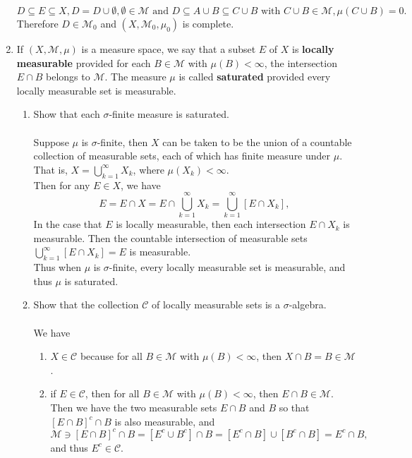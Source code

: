 \begin{enumerate}
	\[
		D\subseteq E\subseteq X,D=D\cup \emptyset, \emptyset\in\mathcal{M}\text{ and }D\subseteq A\cup B\subseteq C\cup B\text{ with }C\cup B\in\mathcal{M}, \mu(C\cup B)=0.
	\]
	Therefore $D\in \mathcal{M}_0$ and $(X,\mathcal{M}_0,\mu_0)$ is complete.
	\item If $(X,\mathcal{M},\mu)$ is a measure space, we say that a subset $E$ of $X$ is \textbf{locally measurable} provided for each $B\in\mathcal{M}$ with $\mu(B)<\infty$, the intersection $E\cap B$ belongs to $\mathcal{M}$.
	The measure $\mu$ is called \textbf{saturated} provided every locally measurable set is measurable.
	\begin{enumerate}[label=(\roman*),align=left]  
		\item Show that each $\sigma$-finite measure is saturated.\\
		\\Suppose $\mu$ is $\sigma$-finite, then $X$ can be taken to be the union of a countable collection of measurable sets, each of which has finite measure under $\mu$.
		\\That is, $X=\bigcup_{k=1}^\infty X_k$, where $\mu(X_k)<\infty$.
		\\Then for any $E\in X$, we have 
		\[
			E=E\cap X = E\cap \bigcup_{k=1}^\infty X_k = \bigcup_{k=1}^\infty[E\cap X_k],
		\]
		In the case that $E$ is locally measurable, then each intersection $E\cap X_k$ is measurable.
		Then the countable intersection of measurable sets $\bigcup_{k=1}^\infty[E\cap X_k]=E$ is measurable.
		\\Thus when $\mu$ is $\sigma$-finite, every locally measurable set is measurable, and thus $\mu$ is saturated.
		\item Show that the collection $\mathcal{C}$ of locally measurable sets is a $\sigma$-algebra.\\
		\\We have
		\begin{enumerate}[label=(\roman*),align=left]   
			\item $X\in\mathcal{C}$ because for all $B\in\mathcal{M}$ with $\mu(B)<\infty$, then $X\cap B=B\in\mathcal{M}$.
			\item if $E\in\mathcal{C}$, then for all $B\in\mathcal{M}$ with $\mu(B)<\infty$, then $E\cap B\in\mathcal{M}$.\\
			Then we have the two measurable sets $E\cap B$ and $B$ so that $[E\cap B]^c\cap B$ is also measurable, and
			\[
				\mathcal{M}\ni[E\cap B]^c\cap B=[E^c\cup B^c]\cap B=[E^c\cap B]\cup[B^c\cap B]=E^c\cap B,
			\]
			and thus $E^c\in\mathcal{C}$. 

\end{enumerate}
\end{enumerate}
\end{enumerate}
